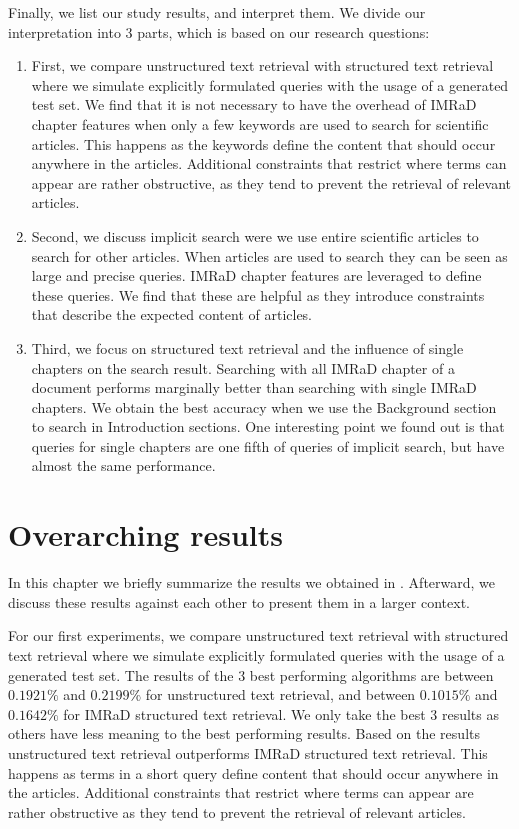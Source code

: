 Finally, we list our study results, and interpret them. We divide our interpretation into $3$ parts, which is based on our research questions:
\begin{enumerate}[label=(\alph*)]
  \item First, we compare unstructured text retrieval with structured text retrieval where we simulate explicitly formulated queries with the usage of a generated test set. We find that it is not necessary to have the overhead of IMRaD chapter features when only a few keywords are used to search for scientific articles. This happens as the keywords define the content that should occur anywhere in the articles. Additional constraints that restrict where terms can appear are rather obstructive, as they tend to prevent the retrieval of relevant articles.
  \item Second, we discuss implicit search were we use entire scientific articles to search for other articles. When articles are used to search they can be seen as large and precise queries. IMRaD chapter features are leveraged to define these queries. We find that these are helpful as they introduce constraints that describe the expected content of articles.
  \item Third, we focus on structured text retrieval and the influence of single chapters on the search result. Searching with all IMRaD chapter of a document performs marginally better than searching with single IMRaD chapters. We obtain the best accuracy when we use the Background section to search in Introduction sections. One interesting point we found out is that queries for single chapters are one fifth of queries of implicit search, but have almost the same performance.
\end{enumerate}

\section{Overarching results}
\label{sec:overarching_results}

In this chapter we briefly summarize the results we obtained in . Afterward, we discuss these results against each other to present them in a larger context.

For our first experiments, we compare unstructured text retrieval with structured text retrieval where we simulate explicitly formulated queries with the usage of a generated test set. The results of the $3$ best performing algorithms are between $0.1921\%$ and $0.2199\%$ for unstructured text retrieval, and between $0.1015\%$ and $0.1642\%$ for IMRaD structured text retrieval. We only take the best $3$ results as others have less meaning to the best performing results. Based on the results unstructured text retrieval outperforms IMRaD structured text retrieval. This happens as terms in a short query define content that should occur anywhere in the articles. Additional constraints that restrict where terms can appear are rather obstructive as they tend to prevent the retrieval of relevant articles.

